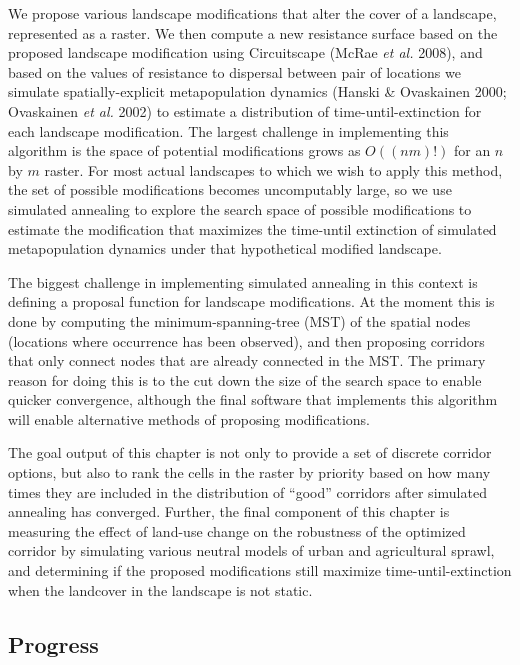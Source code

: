 \documentclass[11pt]{article}
\begin{document}
We propose various landscape modifications that alter the cover of a
landscape, represented as a raster. We then compute a new resistance
surface based on the proposed landscape modification using Circuitscape
(McRae \emph{et al.} 2008), and based on the values of resistance to
dispersal between pair of locations we simulate spatially-explicit
metapopulation dynamics (Hanski \& Ovaskainen 2000; Ovaskainen \emph{et
al.} 2002) to estimate a distribution of time-until-extinction for each
landscape modification. The largest challenge in implementing this
algorithm is the space of potential modifications grows as \(O((nm)!)\)
for an \(n\) by \(m\) raster. For most actual landscapes to which we
wish to apply this method, the set of possible modifications becomes
uncomputably large, so we use simulated annealing to explore the search
space of possible modifications to estimate the modification that
maximizes the time-until extinction of simulated metapopulation dynamics
under that hypothetical modified landscape.

The biggest challenge in implementing simulated annealing in this
context is defining a proposal function for landscape modifications. At
the moment this is done by computing the minimum-spanning-tree (MST) of
the spatial nodes (locations where occurrence has been observed), and
then proposing corridors that only connect nodes that are already
connected in the MST. The primary reason for doing this is to the cut
down the size of the search space to enable quicker convergence,
although the final software that implements this algorithm will enable
alternative methods of proposing modifications.

The goal output of this chapter is not only to provide a set of discrete
corridor options, but also to rank the cells in the raster by priority
based on how many times they are included in the distribution of
``good'' corridors after simulated annealing has converged. Further, the
final component of this chapter is measuring the effect of land-use
change on the robustness of the optimized corridor by simulating various
neutral models of urban and agricultural sprawl, and determining if the
proposed modifications still maximize time-until-extinction when the
landcover in the landscape is not static.

\hypertarget{progress-2}{%
\subsection{Progress}\label{progress-2}}
\end{document}
